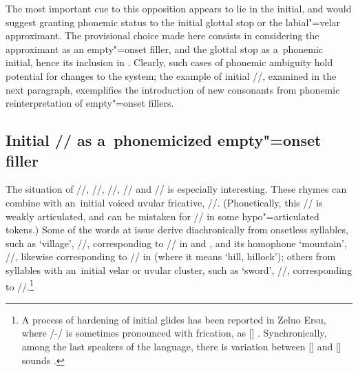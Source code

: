 			The most important cue to this opposition appears to lie in the initial, and would suggest granting phonemic status to the initial glottal stop or the labial"=velar approximant. The provisional choice made here consists in considering the approximant as an empty"=onset filler, and the glottal stop as a~phonemic initial, hence its inclusion in . Clearly, such cases of phonemic ambiguity hold potential for changes to the system; the example of initial //, examined in the next paragraph, exemplifies the introduction of new consonants from phonemic reinterpretation of empty"=onset fillers.
			
			\subsection{Initial // as a~phonemicized empty"=onset filler}
			\label{sec:theinitialvoiceduvularfricativeasaphonemicizedemptyonsetfiller}
			
			
			The situation of //, //, //, // and // is especially
			interesting. These rhymes can combine with an~initial voiced uvular fricative,
			//. (Phonetically, this // is weakly articulated, and can be mistaken for // in
			some hypo"=articulated tokens.) Some of the words at issue derive diachronically from
			onsetless syllables, such as ‘village’, //, corresponding to // in  and
			, and its homophone ‘mountain’, //, likewise corresponding to // in 
			(where it means ‘hill, hillock’); others from syllables with an~initial velar or uvular cluster,
			such as ‘sword’, //, corresponding to  //.\footnote{A process of hardening of
			initial glides has been reported in Zeluo {Ersu}, where /-/ is sometimes pronounced with frication, as
			[] \citep{sun1982}. Synchronically, among the last speakers of the language, there is variation between [] and [] sounds \citep{chirkovaduoxu2014}.}
			
